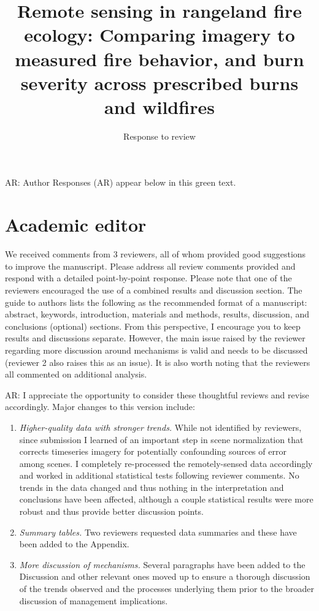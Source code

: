 \documentclass[parskip=half, american]{scrartcl}
\title{\Large Remote sensing in rangeland fire ecology: Comparing imagery to measured fire behavior, and burn severity across prescribed burns and wildfires  }
\subtitle{Response to review}
\author{ }
\date{}
\newcommand{\AR}[1]
	{\color{PineGreen}AR: #1\color{black} \par }
\begin{document}
\maketitle

\vspace{-2cm} 

\AR{Author Responses (AR) appear below in this green text.}

\section*{Academic editor}

We received comments from 3 reviewers, all of whom provided good suggestions to improve the manuscript. Please address all review comments provided and respond with a detailed point-by-point response. 
Please note that one of the reviewers encouraged the use of a combined results and discussion section. The guide to authors lists the following as the recommended format of a manuscript: abstract, keywords, introduction, materials and methods, results, discussion, and conclusions (optional) sections. From this perspective, I encourage you to keep results and discussions separate. 
However, the main issue raised by the reviewer regarding more discussion around mechanisms is valid and needs to be discussed (reviewer 2 also raises this as an issue). 
It is also worth noting that the reviewers all commented on additional analysis. 

\AR{I appreciate the opportunity to consider these thoughtful reviews and revise accordingly. Major changes to this version include: 
	
\begin{enumerate}
	\item \emph{Higher-quality data with stronger trends.} 
	While not identified by reviewers, since submission I learned of an important step in scene normalization that corrects timeseries imagery for potentially confounding sources of error among scenes. 
	I completely re-processed the remotely-sensed data accordingly and worked in additional statistical tests following reviewer comments. 
	No trends in the data changed and thus nothing in the interpretation and conclusions have been affected, although a couple statistical results were more robust and thus provide better discussion points. 
	\item \emph{Summary tables.}
	Two reviewers requested data summaries and these have been added to the Appendix.
	\item \emph{More discussion of mechanisms.}
	Several paragraphs have been added to the Discussion and other relevant ones moved up to ensure a thorough discussion of the trends observed and the processes underlying them prior to the broader discussion of management implications. 
\end{enumerate}



} 
\end{document}
